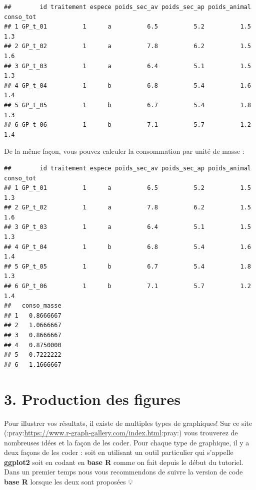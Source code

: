 \documentclass[
]{article}
\newenvironment{Shaded}{\begin{snugshade}}{\end{snugshade}}
\newcommand{\KeywordTok}[1]{\textcolor[rgb]{0.13,0.29,0.53}{\textbf{#1}}}
\newcommand{\NormalTok}[1]{#1}
\newcommand{\OperatorTok}[1]{\textcolor[rgb]{0.81,0.36,0.00}{\textbf{#1}}}
\newcommand{\StringTok}[1]{\textcolor[rgb]{0.31,0.60,0.02}{#1}}
\begin{document}
\begin{verbatim}
##        id traitement espece poids_sec_av poids_sec_ap poids_animal conso_tot
## 1 GP_t_01          1      a          6.5          5.2          1.5       1.3
## 2 GP_t_02          1      a          7.8          6.2          1.5       1.6
## 3 GP_t_03          1      a          6.4          5.1          1.5       1.3
## 4 GP_t_04          1      b          6.8          5.4          1.6       1.4
## 5 GP_t_05          1      b          6.7          5.4          1.8       1.3
## 6 GP_t_06          1      b          7.1          5.7          1.2       1.4
\end{verbatim}

De la même façon, vous pouvez calculer la consommation par unité de
masse :

\begin{Shaded}
\end{Shaded}

\begin{verbatim}
##        id traitement espece poids_sec_av poids_sec_ap poids_animal conso_tot
## 1 GP_t_01          1      a          6.5          5.2          1.5       1.3
## 2 GP_t_02          1      a          7.8          6.2          1.5       1.6
## 3 GP_t_03          1      a          6.4          5.1          1.5       1.3
## 4 GP_t_04          1      b          6.8          5.4          1.6       1.4
## 5 GP_t_05          1      b          6.7          5.4          1.8       1.3
## 6 GP_t_06          1      b          7.1          5.7          1.2       1.4
##   conso_masse
## 1   0.8666667
## 2   1.0666667
## 3   0.8666667
## 4   0.8750000
## 5   0.7222222
## 6   1.1666667
\end{verbatim}

\hypertarget{production-des-figures}{%
\section{3. Production des figures}\label{production-des-figures}}

Pour illustrer vos résultats, il existe de multiples types de
graphiques! Sur ce site
(:pray:\url{https://www.r-graph-gallery.com/index.html}:pray:) vous
trouverez de nombreuses idées et la façon de les coder. Pour chaque type
de graphique, il y a deux façons de les coder : soit en utilisant un
outil particulier qui s'appelle \textbf{ggplot2} soit en codant en
\textbf{base R} comme on fait depuis le début du tutoriel. Dans un
premier temps nous vous recommendons de suivre la version de code
\textbf{base R} lorsque les deux sont proposées 💡
\end{document}
